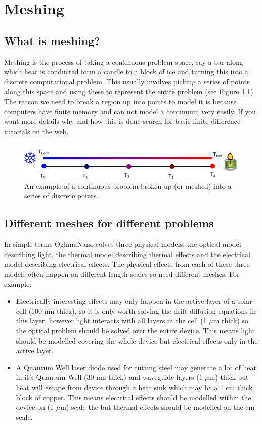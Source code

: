 \chapter{Meshing}
\label{ref:mesh}

\section{What is meshing?}
Meshing is the process of taking a continuous problem space, say a bar along which heat is conducted form a candle to a block of ice and turning this into a discrete computational problem.  This usually involves picking a series of points along this space and using these to represent the entire problem (see Figure \ref{fig:emeshdiagram}). The reason we need to break a region up into points to model it is because computers have finite memory and can not model a continuum very easily. If you want more details why and how this is done search for basic finite difference tutorials on the web.

\begin{figure}[H]
\centering
\includegraphics[width=\textwidth]{./images/mesh/general_mesh_diagram.png}
\caption{An example of a continuous problem broken up (or meshed) into a series of discrete points.}
\label{fig:emeshdiagram}
\end{figure}

\section{Different meshes for different problems}

In simple terms OghmaNano solves three physical models, the optical model describing light, the thermal model describing thermal effects and the electrical model describing electrical effects. The physical effects from each of these three models often happen on different length scales so need different meshes. For example:

\begin{itemize}
  \item Electrically interesting effects may only happen in the active layer of a solar cell (100 nm thick), so it is only worth solving the drift diffusion equations in this layer, however light interacts with all layers in the cell (1 $\mu$m thick) so the optical problem should be solved over the entire device. This means light should be modelled covering the whole device but electrical effects only in the active layer.
  \item A Quantum Well laser diode used for cutting steel may generate a lot of heat in it's Quantum Well (30 nm thick) and waveguide layers (1 $\mu$m) thick but heat will escape from device through a heat sink which may be a 1 cm thick block of copper. This means electrical effects should be modelled within the device on (1 $\mu$m) scale the but thermal effects should be modelled on the cm scale.
\end{itemize}

